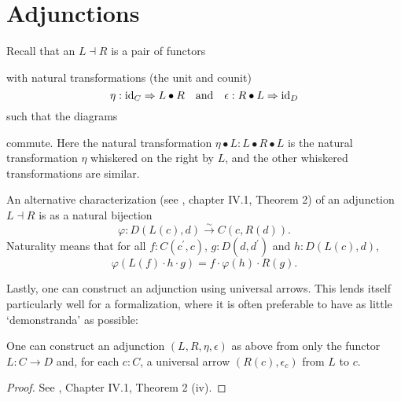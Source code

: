 \section{Adjunctions}

Recall that an  $ L \dashv R $ is a pair of functors
\begin{center}
\end{center}
with natural transformations (the unit and counit)
\[ \eta: \text{id}_{C} \Rightarrow L \bullet R \quad \text{and} \quad \epsilon: R \bullet L \Rightarrow \text{id}_{D} \]
such that the diagrams
\begin{center}
  \qquad
\end{center}
commute. Here the natural transformation $ \eta \bullet L: L \bullet R \bullet L $ is the natural transformation $ \eta $ whiskered on the right by $ L $, and the other whiskered transformations are similar.

An alternative characterization (see \cite{MacLane}, chapter IV.1, Theorem 2) of an adjunction $ L \dashv R $ is as a natural bijection
\[ \varphi: D(L(c), d) \xrightarrow{\sim} C(c, R(d)). \]
Naturality means that for all $ f: C(c^\prime, c) $, $ g: D(d, d^\prime) $ and $ h: D(L(c), d) $,
\[ \varphi(L(f) \cdot h \cdot g) = f \cdot \varphi(h) \cdot R(g). \]

Lastly, one can construct an adjunction using universal arrows. This lends itself particularly well for a formalization, where it is often preferable to have as little `demonstranda' as possible:
\begin{lemma}
  One can construct an adjunction $ (L, R, \eta, \epsilon) $ as above from only the functor $ L: C \to D $ and, for each $ c: C $, a universal arrow $ (R(c), \epsilon_c) $ from $ L $ to $ c $.
\end{lemma}
\begin{proof}
  See \cite{MacLane}, Chapter IV.1, Theorem 2 (iv).
\end{proof}

